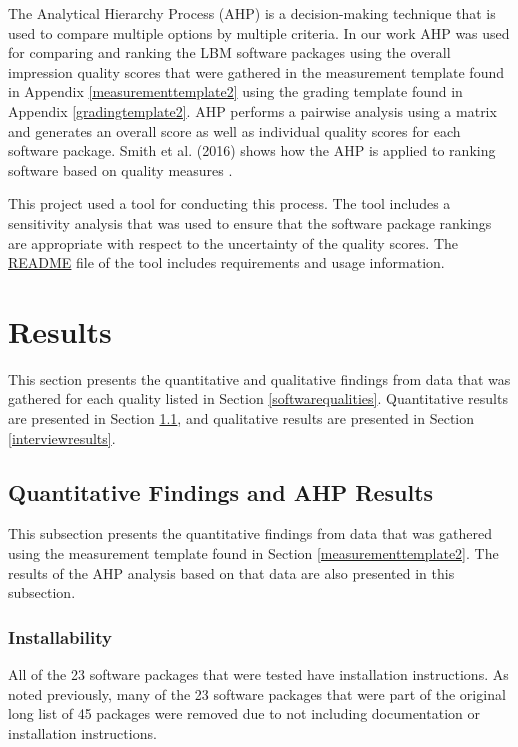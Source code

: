 \documentclass[12pt, notitlepage]{article}
\begin{document}
The Analytical Hierarchy Process (AHP) is a decision-making technique that is used to compare multiple options by multiple criteria. In our work AHP was used for comparing and ranking the LBM software packages using the overall impression quality scores that were gathered in the measurement template found in Appendix \ref{measurementtemplate2} using the grading template found in Appendix \ref{gradingtemplate2}. AHP performs a pairwise analysis using a matrix and generates an overall score as well as individual quality scores for each software package. Smith et al. (2016) shows how the AHP is applied to ranking software based on quality measures \cite{SmithEtAl2016}. 

This project used a tool for conducting this process. The tool includes a sensitivity analysis that was used to ensure that the software package rankings are appropriate with respect to the uncertainty of the quality scores. The \href{https://github.com/smiths/AIMSS/blob/master/StateOfPractice/AHP2020/LBM/README.txt}{README} file of the tool includes requirements and usage information.

\newpage
\section{Results}\label{qualityresults}

This section presents the quantitative and qualitative findings from data that was gathered for each quality listed in Section \ref{softwarequalities}. Quantitative results are presented in Section \ref{AHPresults}, and qualitative results are presented in Section \ref{interviewresults}.

\subsection{Quantitative Findings and AHP Results}\label{AHPresults}

This subsection presents the quantitative findings from data that was gathered using the measurement template found in Section \ref{measurementtemplate2}. The results of the AHP analysis based on that data are also presented in this subsection.

\subsubsection{Installability}

All of the 23 software packages that were tested have installation instructions. As noted previously, many of the 23 software packages that were part of the original long list of 45 packages were removed due to not including documentation or installation instructions. 
\end{document}
